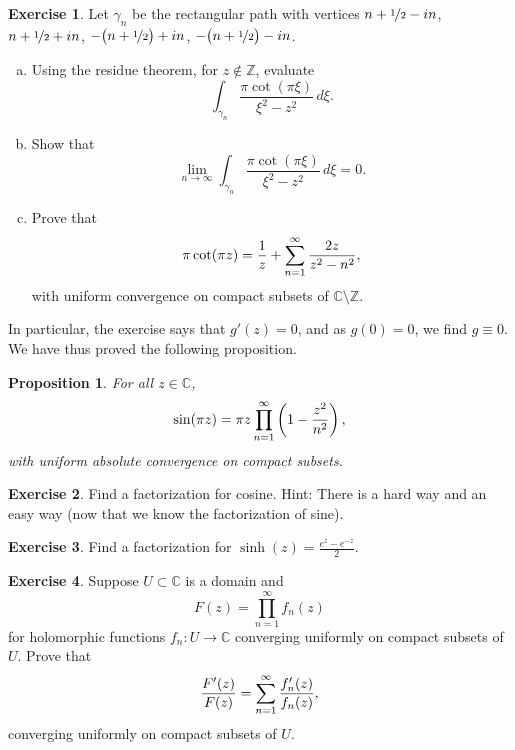 \documentclass[12pt,openany]{book}
\newcommand{\avoidbreak}{\postdisplaypenalty=100}
\newcommand{\C}{{\mathbb{C}}}
\newcommand{\Z}{{\mathbb{Z}}}
\theoremstyle{plain}
\newtheorem{prop}[thm]{Proposition}
\theoremstyle{remark}
\theoremstyle{definition}
\newenvironment{exbox}{%
    \def\FrameCommand{\vrule width 1pt \relax\hspace{10pt}}%
    \MakeFramed{\advance\hsize-\width\FrameRestore}%
}{%
    \endMakeFramed
}
\newenvironment{exparts}{%
    \leavevmode\begin{enumerate}[a),noitemsep,topsep=0pt,parsep=0pt,partopsep=0pt]
}{%
    \end{enumerate}
}
\theoremstyle{exercise}
\newtheorem{exercise}{Exercise}[section]
\theoremstyle{example}
\begin{document}
\begin{exbox}
\begin{exercise}
Let $\gamma_n$ be the rectangular path with vertices
$n+\nicefrac{1}{2} - in$, 
$n+\nicefrac{1}{2} + in$, 
$-\bigl(n+\nicefrac{1}{2}\bigr) + in$, 
$-\bigl(n+\nicefrac{1}{2}\bigr) - in$.
\begin{exparts}
\item
Using the residue theorem, for $z \notin \Z$, evaluate
\begin{equation*}
\int_{\gamma_n}\frac{\pi \cot (\pi \xi)}{\xi^2-z^2} \, d\xi .
\end{equation*}
\item
Show that
\begin{equation*}
\lim_{n\to \infty}
\int_{\gamma_n}\frac{\pi \cot (\pi \xi)}{\xi^2-z^2} \, d\xi = 0 .
\end{equation*}
\item
Prove that
\begin{equation*}
\pi \cot (\pi z) =
\frac{1}{z}
+
\sum_{n=1}^\infty 
\frac{2z}{z^2-n^2} ,
\avoidbreak
\end{equation*}
with uniform convergence on compact subsets of $\C \setminus \Z$.
\end{exparts}
\end{exercise}
\end{exbox}

In particular, the exercise says that $g'(z)=0$, and as $g(0)=0$, we find $g \equiv 0$.
We have thus proved the following proposition.

\begin{prop}
For all $z \in \C$,
\begin{equation*}
\sin(\pi z) =
\pi z \prod_{n=1}^\infty 
\left(1-\frac{z^2}{n^2}\right) ,
\avoidbreak
\end{equation*}
with uniform absolute convergence on compact subsets.
\end{prop}


\begin{exbox}
\begin{exercise}
Find a factorization for cosine.  Hint: There is a hard way and an
easy way (now that we know the factorization of sine).
\end{exercise}

\begin{exercise}
Find a factorization for $\sinh(z) = \frac{e^z-e^{-z}}{2}$.
\end{exercise}

\begin{exercise}
Suppose $U \subset \C$ is a domain and
\begin{equation*}
F(z) = \prod_{n=1}^\infty f_n(z)
\end{equation*}
for holomorphic functions $f_n \colon U \to \C$ converging uniformly 
on compact subsets of $U$.  Prove that
\begin{equation*}
\frac{F'(z)}{F(z)} = \sum_{n=1}^\infty \frac{f_n'(z)}{f_n(z)} ,
\avoidbreak
\end{equation*}
converging uniformly on compact subsets of $U$.
\end{exercise}
\end{exbox}
\end{document}
